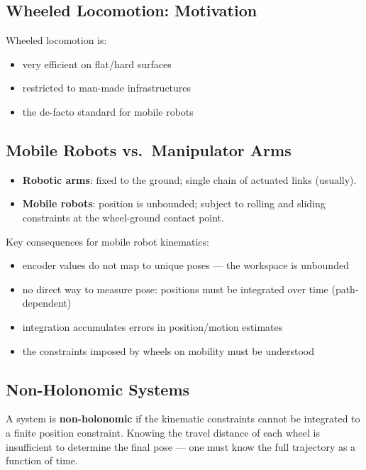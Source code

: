 \documentclass[11pt,a4paper]{article}
\theoremstyle{definition}
\theoremstyle{plain}
\theoremstyle{remark}
\begin{document}
\subsection{Wheeled Locomotion: Motivation}

Wheeled locomotion is:
\begin{itemize}
    \item very efficient on flat/hard surfaces
    \item restricted to man-made infrastructures
    \item the de-facto standard for mobile robots
\end{itemize}

\subsection{Mobile Robots vs.\ Manipulator Arms}

\begin{itemize}
    \item \textbf{Robotic arms}: fixed to the ground; single chain of actuated links (usually).
    \item \textbf{Mobile robots}: position is unbounded; subject to rolling and sliding constraints at the wheel-ground contact point.
\end{itemize}

Key consequences for mobile robot kinematics:
\begin{itemize}
    \item encoder values do not map to unique poses — the workspace is unbounded
    \item no direct way to measure pose: positions must be integrated over time (path-dependent)
    \item integration accumulates errors in position/motion estimates
    \item the constraints imposed by wheels on mobility must be understood
\end{itemize}

\subsection{Non-Holonomic Systems}

\begin{tcolorbox}[colback=blue!5!white,colframe=blue!75!black,title=\textbf{Non-Holonomic System}]
A system is \textbf{non-holonomic} if the kinematic constraints cannot be integrated to a finite position constraint. Knowing the travel distance of each wheel is insufficient to determine the final pose — one must know the full trajectory as a function of time.
\end{tcolorbox}
\end{document}
